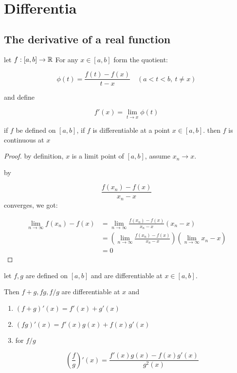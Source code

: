 \section{Differentia}

\subsection{The derivative of a real function}

\begin{definition}
    let $f: [a,b] \to \mathbb{R}$ For any $x \in [a,b]$ form the quotient:

    \[
        \phi(t) = \frac{f(t) -f(x)}{t-x} \quad (a < t <b,\: t \ne x)
    \]

    and define

    \[
        f'(x) = \lim_{t \to x} \phi(t)
    \]
\end{definition}

\begin{thm}
    if $f$ be defined on $[a,b]$,  if $f$ is differentiable at a point $x \in [a,b]$.
    then $f$ is continuous at $x$
\end{thm}

\begin{proof}
    by definition, $x$ is a limit point of $[a,b]$, assume $x_n \to x$.

    by 
    
    \[
    \frac{f(x_n) - f(x)}{  x_n - x}
    \] converges, we got:

    \begin{align}
        \lim_{n \to \infty}f(x_n) - f(x) &= \lim_{n \to \infty}\frac{f(x_n) - f(x)}{x_n -x}(x_n - x) \\
        &= \left(\lim_{n \to \infty}\frac{f(x_n) - f(x)}{x_n -x}\right) \left(\lim_{n \to \infty}x_n -x\right) \\
        &= 0
    \end{align}
\end{proof}

\begin{thm}
    let $f,g$ are defined on $[a,b]$ and are differentiable at $x \in [a,b]$.

    Then $f+g, fg, f/g$ are differentiable at $x$ and

    \begin{enumerate}
        \item $(f+g)'(x) = f'(x) + g'(x)$
        \item $(fg)'(x) = f'(x)g(x) + f(x)g'(x)$ 
        \item for $f/g$

        \[
            (\frac{f}{g})'(x) = \frac{f'(x)g(x) - f(x)g'(x)}{g^2(x)}
        \]
    \end{enumerate}
\end{thm}

